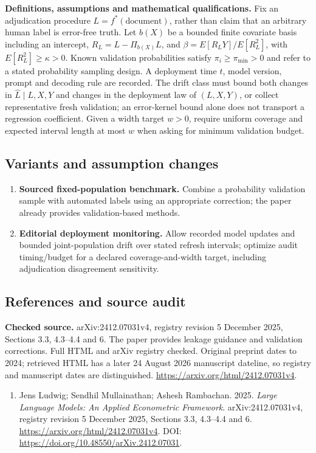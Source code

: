 \documentclass[11pt,a4paper]{article}
\begin{document}
\textbf{Definitions, assumptions and mathematical qualifications.} Fix an adjudication procedure \(L=f^*(\text{document})\), rather than claim that an arbitrary human label is error-free truth. Let \(b(X)\) be a bounded finite covariate basis including an intercept, \(R_L=L-\Pi_{b(X)}L\), and \(\beta=E[R_LY]/E[R_L^2]\), with \(E[R_L^2]\geq\kappa>0\). Known validation probabilities satisfy \(\pi_i\geq\pi_{\min}>0\) and refer to a stated probability sampling design. A deployment time \(t\), model version, prompt and decoding rule are recorded. The drift class must bound both changes in \(\widehat L\mid L,X,Y\) and changes in the deployment law of \((L,X,Y)\), or collect representative fresh validation; an error-kernel bound alone does not transport a regression coefficient. Given a width target \(w>0\), require uniform coverage and expected interval length at most \(w\) when asking for minimum validation budget.
\subsection*{Variants and assumption changes}
\begin{enumerate}
\item \textbf{Sourced fixed-population benchmark.} Combine a probability validation sample with automated labels using an appropriate correction; the paper already provides validation-based methods.
\item \textbf{Editorial deployment monitoring.} Allow recorded model updates and bounded joint-population drift over stated refresh intervals; optimize audit timing/budget for a declared coverage-and-width target, including adjudication disagreement sensitivity.
\end{enumerate}
\subsection*{References and source audit}
\textbf{Checked source.} arXiv:2412.07031v4, registry revision 5 December 2025, Sections 3.3, 4.3--4.4 and 6. The paper provides leakage guidance and validation corrections. Full HTML and arXiv registry checked. Original preprint dates to 2024; retrieved HTML has a later 24 August 2026 manuscript dateline, so registry and manuscript dates are distinguished. \url{https://arxiv.org/html/2412.07031v4}.
\begin{enumerate}\raggedright
\item\hypertarget{definitions:source:30007709:1}{} Jens Ludwig; Sendhil Mullainathan; Ashesh Rambachan. 2025. \emph{Large Language Models: An Applied Econometric Framework}. arXiv:2412.07031v4, registry revision 5 December 2025, Sections 3.3, 4.3--4.4 and 6.
\url{https://arxiv.org/html/2412.07031v4}.
DOI: \url{https://doi.org/10.48550/arXiv.2412.07031}.
\end{enumerate}
\end{document}

